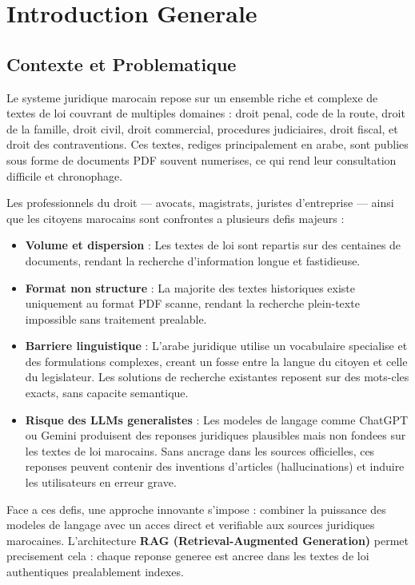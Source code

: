 \chapter{Introduction Generale}

\section{Contexte et Problematique}

Le systeme juridique marocain repose sur un ensemble riche et complexe de textes de loi couvrant de multiples domaines : droit penal, code de la route, droit de la famille, droit civil, droit commercial, procedures judiciaires, droit fiscal, et droit des contraventions. Ces textes, rediges principalement en arabe, sont publies sous forme de documents PDF souvent numerises, ce qui rend leur consultation difficile et chronophage.

Les professionnels du droit --- avocats, magistrats, juristes d'entreprise --- ainsi que les citoyens marocains sont confrontes a plusieurs defis majeurs :

\begin{itemize}
    \item \textbf{Volume et dispersion} : Les textes de loi sont repartis sur des centaines de documents, rendant la recherche d'information longue et fastidieuse.

    \item \textbf{Format non structure} : La majorite des textes historiques existe uniquement au format PDF scanne, rendant la recherche plein-texte impossible sans traitement prealable.

    \item \textbf{Barriere linguistique} : L'arabe juridique utilise un vocabulaire specialise et des formulations complexes, creant un fosse entre la langue du citoyen et celle du legislateur. Les solutions de recherche existantes reposent sur des mots-cles exacts, sans capacite semantique.

    \item \textbf{Risque des LLMs generalistes} : Les modeles de langage comme ChatGPT ou Gemini produisent des reponses juridiques plausibles mais non fondees sur les textes de loi marocains. Sans ancrage dans les sources officielles, ces reponses peuvent contenir des inventions d'articles (hallucinations) et induire les utilisateurs en erreur grave.
\end{itemize}

Face a ces defis, une approche innovante s'impose : combiner la puissance des modeles de langage avec un acces direct et verifiable aux sources juridiques marocaines. L'architecture \textbf{RAG (Retrieval-Augmented Generation)} permet precisement cela : chaque reponse generee est ancree dans les textes de loi authentiques prealablement indexes.

